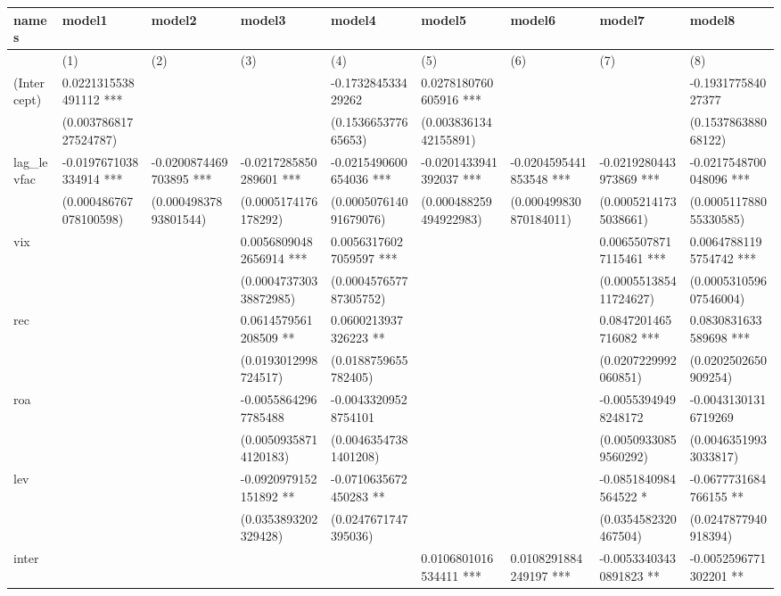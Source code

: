 \begin{table}[ht]
\centering
\begin{tabular}{lllllllll}
  \hline
names & model1 & model2 & model3 & model4 & model5 & model6 & model7 & model8 \\ 
  \hline
 & (1) & (2) & (3) & (4) & (5) & (6) & (7) & (8) \\ 
  (Intercept) & 0.0221315538491112 *** &  &  & -0.173284533429262 & 0.0278180760605916 *** &  &  & -0.193177584027377 \\ 
   & (0.00378681727524787) &  &  & (0.153665377665653) & (0.00383613442155891) &  &  & (0.153786388068122) \\ 
  lag\_levfac & -0.0197671038334914 *** & -0.0200874469703895 *** & -0.0217285850289601 *** & -0.0215490600654036 *** & -0.0201433941392037 *** & -0.0204595441853548 *** & -0.0219280443973869 *** & -0.0217548700048096 *** \\ 
   & (0.000486767078100598) & (0.00049837893801544) & (0.0005174176178292) & (0.000507614091679076) & (0.000488259494922983) & (0.000499830870184011) & (0.00052141735038661) & (0.000511788055330585) \\ 
  vix &  &  & 0.00568090482656914 *** & 0.00563176027059597 *** &  &  & 0.00655078717115461 *** & 0.00647881195754742 *** \\ 
   &  &  & (0.000473730338872985) & (0.000457657787305752) &  &  & (0.000551385411724627) & (0.000531059607546004) \\ 
  rec &  &  & 0.0614579561208509 ** & 0.0600213937326223 ** &  &  & 0.0847201465716082 *** & 0.0830831633589698 *** \\ 
   &  &  & (0.0193012998724517) & (0.0188759655782405) &  &  & (0.0207229992060851) & (0.0202502650909254) \\ 
  roa &  &  & -0.00558642967785488 & -0.00433209528754101 &  &  & -0.00553949498248172 & -0.00431301316719269 \\ 
   &  &  & (0.00509358714120183) & (0.00463547381401208) &  &  & (0.00509330859560292) & (0.00463519933033817) \\ 
  lev &  &  & -0.0920979152151892 ** & -0.0710635672450283 ** &  &  & -0.0851840984564522 * & -0.0677731684766155 ** \\ 
   &  &  & (0.0353893202329428) & (0.0247671747395036) &  &  & (0.0354582320467504) & (0.0247877940918394) \\ 
  inter &  &  &  &  & 0.0106801016534411 *** & 0.0108291884249197 *** & -0.00533403430891823 ** & -0.0052596771302201 ** \\ 

\end{tabular}
\end{table}
